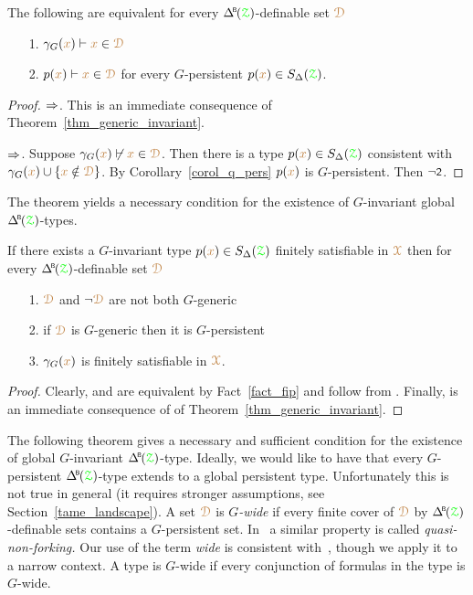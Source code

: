 \begin{corollary}\label{corol_gammaG_invaqriancer}
  The following are equivalent for every $\BDelta(\grZ)$-definable set ${\color{brown}\EuScript D}$
  \begin{itemize}
    \item [1.] $\gamma_G({\color{brown} x})\vdash{\color{brown}x}\in{\color{brown}\EuScript D}$
    \item [2.] $p({\color{brown} x})\vdash{\color{brown}x}\in{\color{brown}\EuScript D}$ for every $G$-persistent $p({\color{brown} x})\in S_\Delta({\color{green}\EuScript Z})$.
  \end{itemize}
\end{corollary}

\begin{proof}
  $\Rightarrow$.
  This is an immediate consequence of Theorem~\ref{thm_generic_invariant}.

  $\Rightarrow$.
  Suppose $\gamma_G({\color{brown} x})\not\vdash{\color{brown}x}\in{\color{brown}\EuScript D}$.
  Then there is a type $p({\color{brown} x})\in S_\Delta({\color{green}\EuScript Z})$ consistent with $\gamma_G({\color{brown} x})\cup\{{\color{brown} x}\notin{\color{brown}\EuScript D}\}$.
  By Corollary~\ref{corol_q_pers} $p({\color{brown} x})$ is $G$-persistent.
  Then $\neg\textsf{\small 2}$.
\end{proof}

The theorem yields a necessary condition for the existence of $G$-invariant global $\BDelta({\grZ})$-types.

\begin{corollary}\label{corol_def_mu}
  If there exists a $G$-invariant type $p({\color{brown} x})\in S_\Delta({\color{green}\EuScript Z})$ finitely satisfiable in ${\color{brown}\EuScript X}$ then for every $\BDelta({\grZ})$-definable set ${\color{brown}\EuScript D}$
  \begin{itemize}
    \item[1.] ${\color{brown}\EuScript D}$ and $\neg{\color{brown}\EuScript D}$ are not both $G$-generic
    \item[2.] if ${\color{brown}\EuScript D}$ is $G$-generic then it is $G$-persistent
    \item[3.] $\gamma_G({\color{brown} x})$ is finitely satisfiable in ${\color{brown}\EuScript X}$.
  \end{itemize}
\end{corollary}

\begin{proof}
  Clearly,  and  are equivalent by Fact~\ref{fact_fip} and follow from .
  Finally,  is an immediate consequence of  of Theorem~\ref{thm_generic_invariant}.
\end{proof}

The following theorem gives a necessary and sufficient condition for the  existence of global $G$-invariant $\BDelta({\grZ})$-type.
Ideally, we would like to have that every $G$-persistent $\BDelta({\grZ})$-type extends to a global persistent type.
Unfortunately this is not true in general (it requires stronger assumptions, see Section~\ref{tame_landscape}).
A set ${\color{brown}\EuScript D}$ is \emph{$G$-wide\/} if every finite cover of ${\color{brown}\EuScript D}$ by $\BDelta({\grZ})$-definable sets contains a $G$-persistent set.
In~\cite{CK} a similar property is called \textit{quasi-non-forking.}
Our use of the term \textit{wide\/} is consistent with~\cite{Hr}, though we apply it to a narrow context.
A type is $G$-wide if every conjunction of formulas in the type is $G$-wide.

